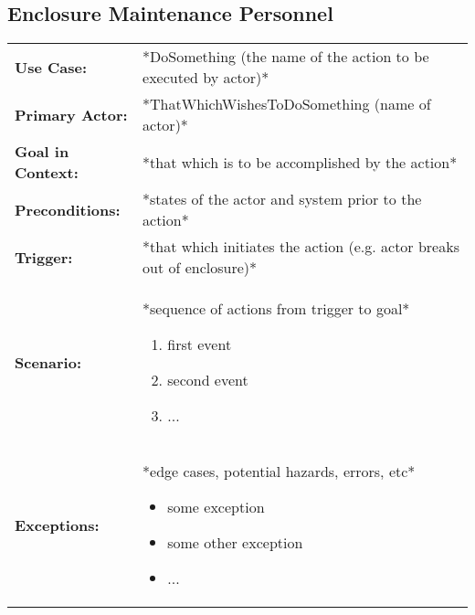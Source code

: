 \documentclass[12pt]{article}
\begin{document}
    \subsection{Enclosure Maintenance Personnel}
    \begin{table}[H]
    \begin{tabular}{lp{9.9cm}}
        \hline
        \textbf{Use Case:}                     & *DoSomething (the name of the action to be executed by actor)* \\

        \textbf{Primary Actor:}                & *ThatWhichWishesToDoSomething (name of actor)*\\

        \textbf{Goal in Context:}              & *that which is to be accomplished by the action* \\

        \textbf{Preconditions:}                & *states of the actor and system prior to the action* \\

        \textbf{Trigger:}                      & *that which initiates the action (e.g. actor breaks out of enclosure)*\\

        \textbf{Scenario:}                     & *sequence of actions from trigger to goal*
                                                 \begin{enumerate}
                                                     \item first event
                                                     \item second event
                                                     \item ...
                                                 \end{enumerate} \\

        \textbf{Exceptions:}                   & *edge cases, potential hazards, errors, etc*
                                                 \begin{itemize}
                                                     \item[] some exception
                                                     \item[] some other exception
                                                     \item[] ...
                                                 \end{itemize}\\


\end{tabular}
\end{table}
\end{document}
